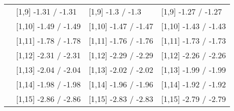 \begin{table}
\begin{tabular}[t]{llll}
 & {}[1,9] -1.31  / -1.31 & {}[1,9] -1.3  / -1.3 & {}[1,9] -1.27  / -1.27\\
 & {}[1,10] -1.49  / -1.49 & {}[1,10] -1.47  / -1.47 & {}[1,10] -1.43  / -1.43\\
 & {}[1,11] -1.78  / -1.78 & {}[1,11] -1.76  / -1.76 & {}[1,11] -1.73  / -1.73\\
 & {}[1,12] -2.31  / -2.31 & {}[1,12] -2.29  / -2.29 & {}[1,12] -2.26  / -2.26\\
\addlinespace
 & {}[1,13] -2.04  / -2.04 & {}[1,13] -2.02  / -2.02 & {}[1,13] -1.99  / -1.99\\
 & {}[1,14] -1.98  / -1.98 & {}[1,14] -1.96  / -1.96 & {}[1,14] -1.92  / -1.92\\
 & {}[1,15] -2.86  / -2.86 & {}[1,15] -2.83  / -2.83 & {}[1,15] -2.79  / -2.79\\
\bottomrule
\end{tabular}
\end{table}
